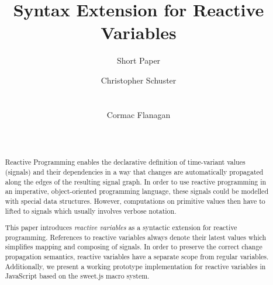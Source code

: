 \documentclass{sig-alternate-05-2015}
\begin{document}






\title{Syntax Extension for Reactive Variables}
\subtitle{Short Paper}


\author{
\alignauthor Christopher Schuster\\
       \\
       \\
\alignauthor Cormac Flanagan\\
       \\
       \\
}

\maketitle
\begin{abstract}
  Reactive Programming enables the declarative definition of time-variant values (signals) and their dependencies in a way that changes are automatically propagated along the edges of the resulting signal graph.  In order to use reactive programming in an imperative, object-oriented programming language, these signals could be modelled with special data structures.  However, computations on primitive values then have to lifted to signals which usually involves verbose notation.


  This paper introduces \emph{reactive variables} as a syntactic extension for reactive programming.  References to reactive variables always denote their latest values which simplifies mapping and composing of signals.  In order to preserve the correct change propagation semantics, reactive variables have a separate scope from regular variables.  Additionally, we present a working prototype implementation for reactive variables in JavaScript based on the sweet.js macro system.
\end{abstract}
\end{document}
